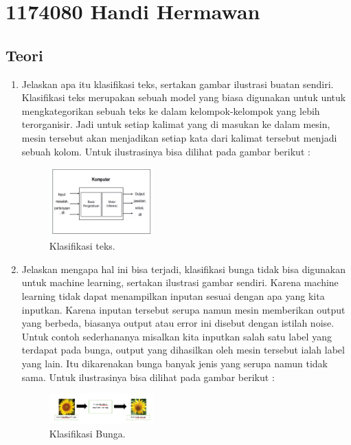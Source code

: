 \section{1174080 Handi Hermawan}
\subsection{Teori}
\begin{enumerate}

	\item Jelaskan apa itu klasifikasi teks, sertakan gambar ilustrasi buatan sendiri.
	\hfill\break
	Klasifikasi teks merupakan sebuah model yang biasa digunakan untuk untuk mengkategorikan sebuah teks ke dalam kelompok-kelompok yang lebih terorganisir. Jadi untuk setiap kalimat yang di masukan ke dalam mesin, mesin tersebut akan menjadikan setiap kata dari kalimat tersebut menjadi sebuah kolom. Untuk ilustrasinya bisa dilihat pada gambar berikut : 

	\begin{figure}[H]
	\centering
		\includegraphics[width=4cm]{figures/1174080/4/1.PNG}
		\caption{Klasifikasi teks.}
	\end{figure}

	\item Jelaskan mengapa hal ini bisa terjadi, klasifikasi bunga tidak bisa digunakan untuk machine learning, sertakan ilustrasi gambar sendiri.
	\hfill\break
	Karena machine learning tidak dapat menampilkan inputan sesuai dengan apa yang kita inputkan. Karena inputan tersebut serupa namun mesin memberikan output yang berbeda, biasanya output atau error ini disebut dengan istilah noise. Untuk contoh sederhananya misalkan kita inputkan salah satu label yang terdapat pada bunga, output yang dihasilkan oleh mesin tersebut ialah label yang lain. Itu dikarenakan bunga banyak jenis yang serupa namun tidak sama. Untuk ilustrasinya bisa dilihat pada gambar berikut : 

	\begin{figure}[H]
	\centering
		\includegraphics[width=4cm]{figures/1174080/4/2.PNG}
		\caption{Klasifikasi Bunga.}
	\end{figure}
	

\end{enumerate}
